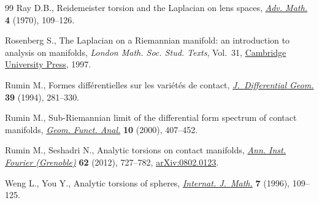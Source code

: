 \begin{thebibliography}{99}
Ray D.B., Reidemeister torsion and the {L}aplacian on lens spaces, \href{https://doi.org/10.1016/0001-8708(70)90018-6}{\textit{Adv.
 Math.}} \textbf{4} (1970), 109--126.

Rosenberg S., The Laplacian on a Riemannian manifold: an introduction to
 analysis on manifolds, \textit{London Math. Soc. Stud. Texts}, Vol.~31,
 \href{https://doi.org/10.1017/CBO9780511623783}{Cambridge University Press}, 1997.

Rumin M., Formes diff\'erentielles sur les vari\'et\'es de contact,
 \href{https://doi.org/10.4310/jdg/1214454873}{\textit{J.~Differential Geom.}} \textbf{39} (1994), 281--330.

Rumin M., Sub-{R}iemannian limit of the differential form spectrum of contact
 manifolds, \href{https://doi.org/10.1007/s000390050013}{\textit{Geom. Funct. Anal.}} \textbf{10} (2000), 407--452.

Rumin M., Seshadri N., Analytic torsions on contact manifolds, \href{https://doi.org/10.5802/aif.2693}{\textit{Ann.
 Inst. Fourier (Grenoble)}} \textbf{62} (2012), 727--782, \href{http://arxiv.org/abs/0802.0123}{arXiv:0802.0123}.

Weng L., You Y., Analytic torsions of spheres, \href{https://doi.org/10.1142/S0129167X96000074}{\textit{Internat. J.~Math.}}
 \textbf{7} (1996), 109--125.

\end{thebibliography}
